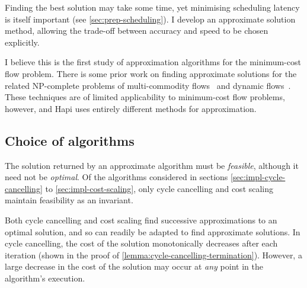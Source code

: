 Finding the best solution may take some time, yet minimising scheduling latency is itself important (see \cref{sec:prep-scheduling}). I develop an approximate solution method, allowing the trade-off between accuracy and speed to be chosen explicitly.


I believe this is the first study of approximation algorithms for the minimum-cost flow problem. There is some prior work on finding approximate solutions for the related NP-complete problems of multi-commodity flows~\cite{Garg:2007} and dynamic flows~\cite{Hoppe:1994}. These techniques are of limited applicability to minimum-cost flow problems\footnotemark, however, and Hapi uses entirely different methods for approximation.

\subsection{Choice of algorithms} \label{sec:impl-approx-choice}

The solution returned by an approximate algorithm must be \emph{feasible}, although it need not be \emph{optimal}. Of the algorithms considered in sections \ref{sec:impl-cycle-cancelling} to \ref{sec:impl-cost-scaling}, only cycle cancelling and cost scaling maintain feasibility as an invariant\footnotemark.

Both cycle cancelling and cost scaling find successive approximations to an optimal solution, and so can readily be adapted to find approximate solutions. In cycle cancelling, the cost of the solution monotonically decreases after each iteration (shown in the proof of \cref{lemma:cycle-cancelling-termination}). However, a large decrease in the cost of the solution may occur at \emph{any} point in the algorithm's execution.

